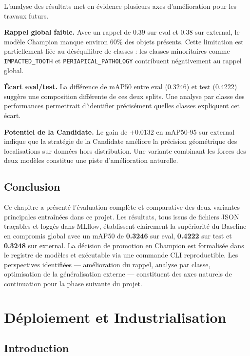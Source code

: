 \documentclass{rapportENSIAS}
\begin{document}
L'analyse des résultats met en évidence plusieurs axes d'amélioration
pour les travaux futurs.

\textbf{Rappel global faible.} Avec un rappel de 0.39 sur eval et
0.38 sur external, le modèle Champion manque environ 60\% des objets
présents. Cette limitation est partiellement liée au déséquilibre de
classes : les classes minoritaires comme \texttt{IMPACTED\_TOOTH}
et \texttt{PERIAPICAL\_PATHOLOGY} contribuent négativement au rappel global.

\textbf{Écart eval/test.} La différence de mAP50 entre eval (0.3246)
et test (0.4222) suggère une composition différente de ces deux splits.
Une analyse par classe des performances permettrait d'identifier
précisément quelles classes expliquent cet écart.

\textbf{Potentiel de la Candidate.} Le gain de $+0.0132$ en mAP50-95
sur external indique que la stratégie de la Candidate améliore la
précision géométrique des localisations sur données hors distribution.
Une variante combinant les forces des deux modèles constitue une
piste d'amélioration naturelle.

\section{Conclusion}

Ce chapitre a présenté l'évaluation complète et comparative des deux
variantes principales entraînées dans ce projet. Les résultats,
tous issus de fichiers JSON traçables et loggés dans MLflow,
établissent clairement la supériorité du Baseline en compromis
global avec un mAP50 de \textbf{0.3246} sur eval, \textbf{0.4222}
sur test et \textbf{0.3248} sur external. La décision de promotion
en Champion est formalisée dans le registre de modèles et exécutable
via une commande CLI reproductible. Les perspectives identifiées
— amélioration du rappel, analyse par classe, optimisation de la
généralisation externe — constituent des axes naturels de continuation
pour la phase suivante du projet.


\chapter{Déploiement et Industrialisation}
\label{chap:deployment}

\section{Introduction}
\end{document}
